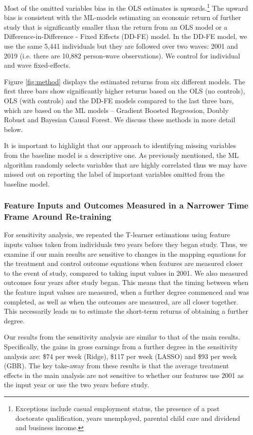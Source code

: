 \documentclass[12pt, a4paper]{article}
\begin{document}
Most of the omitted variables bias in the OLS estimates is upwards.\footnote{Exceptions include casual employment status, the presence of a past doctorate qualification, years unemployed, parental child care and dividend and business income.} The upward bias is consistent with the ML-models estimating an economic return of further study that is significantly smaller than the return from an OLS model or a Difference-in-Difference - Fixed Effects (DD-FE)  model. In the DD-FE model, we use the same 5,441 individuals but they are followed over two waves: 2001 and 2019 (i.e. there are 10,882 person-wave observations). We control for individual and wave fixed-effects. 

Figure \ref{fig:method} displays the estimated returns from six different
models. The first three bars show significantly higher returns based on the OLS
(no controls), OLS (with controls) and the DD-FE models compared to the last
three bars, which are based on the ML models -- Gradient Boosted Regression,
Doubly Robust and Bayesian Causal Forest. We discuss these methods in more
detail below. 

It is important to highlight that our approach to identifying missing variables
from the baseline model is a descriptive one. As previously mentioned,
the ML algorithm randomly selects variables that are highly correlated thus we
may have missed out on reporting the label of important variables omitted from
the baseline model.


\subsubsection{Feature Inputs and Outcomes Measured in a Narrower Time Frame Around Re-training}


For sensitivity analysis, we repeated the T-learner estimations using feature
inputs values taken from individuals two years before they began study. Thus, we
examine if our main results are sensitive to changes in the mapping equations
for the treatment and control outcome equations when features are measured
closer to the event of study, compared to taking input values in 2001. We also
measured outcomes four years after study began. This means that the timing
between when the feature input values are measured, when a further degree
commenced and was completed, as well as when the outcomes are measured, are all
closer together. This necessarily leads us to estimate the short-term returns
of obtaining a further degree. 

Our results from the sensitivity analysis are similar to that of the main
results. Specifically, the gains in gross earnings from a further degree in the
sensitivity analysis are: \$74 per week (Ridge), \$117 per week (LASSO) and
\$93 per week (GBR). The key take-away from these results is that the average
treatment effects in the main analysis are not sensitive to whether our
features use 2001 as the input year or use the two years before study. 
\end{document}
